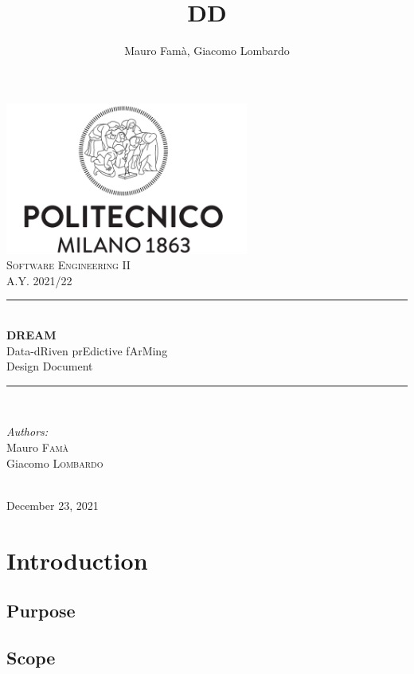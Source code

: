 \documentclass[10pt]{article} %
\title{DD}
\author{Mauro Famà, Giacomo Lombardo}
\begin{document}
\thispagestyle{empty}
\begin{titlepage}
    \newcommand{\HRule}{\rule{\linewidth}{0.5mm}}
    \center
    \includegraphics[width=8cm]{polimi.png}\\[1cm]

    \textsc{\Large Software Engineering II}\\[0.5cm]
    \textsc{\large A.Y. 2021/22}\\[0.5cm]

    \HRule \\[0.4cm]
        { \Huge \bfseries DREAM}\\[0.2cm]
        { \large Data-dRiven prEdictive fArMing}\\[0.4cm]
        { \LARGE Design Document}
    \HRule \\[1.5cm]

    \begin{minipage}{0.4\textwidth}
        \begin{flushleft} \large
        \emph{Authors:}\\
        Mauro \textsc{Famà}\\
        Giacomo \textsc{Lombardo}\\
        \end{flushleft}
    \end{minipage}\\[2cm]

    {\large December 23, 2021}\\[2cm]
    
    \vfill
\end{titlepage}
\newpage
\tableofcontents %
\newpage
\section{Introduction}
\subsection{Purpose}
\subsection{Scope}
\end{document}
